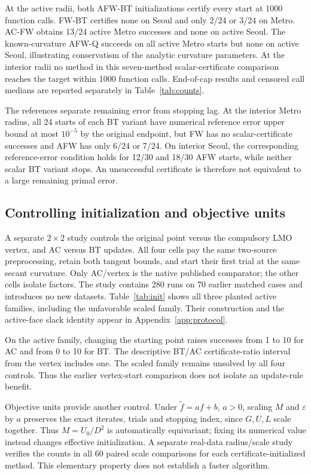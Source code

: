 At the active radii, both AFW-BT initializations certify every start at
1000 function calls. FW-BT certifies none on Seoul and only 2/24 or
3/24 on Metro. AC-FW obtains 13/24 active Metro successes and none
on active Seoul. The known-curvature AFW-Q succeeds on all active
Metro starts but none on active Seoul, illustrating conservatism of
the analytic curvature parameters. At the interior radii no method in
this seven-method scalar-certificate comparison reaches the target
within 1000 function calls. End-of-cap results and censored call
medians are reported separately in Table~\ref{tab:counts}.

The references separate remaining error from stopping lag. At the
interior Metro radius, all 24 starts of each BT variant have numerical
reference error upper bound at most $10^{-5}$ by the original endpoint,
but FW has no scalar-certificate successes and AFW has only 6/24 or
7/24. On interior Seoul, the corresponding reference-error condition
holds for 12/30 and 18/30 AFW starts, while neither scalar BT variant
stops. An unsuccessful certificate is therefore not equivalent to a
large remaining primal error.

\subsection{Controlling initialization and objective units}
A separate $2\times2$ study controls the original point versus the
compulsory LMO vertex, and AC versus BT updates. All four cells pay
the same two-source preprocessing, retain both tangent bounds, and
start their first trial at the same secant curvature. Only AC/vertex
is the native published comparator; the other cells isolate factors.
The study contains 280 runs on 70 earlier matched cases and introduces
no new datasets. Table~\ref{tab:init} shows all three planted active
families, including the unfavorable scaled family. Their construction
and the active-face slack identity appear in Appendix~\ref{app:protocol}.


On the active family, changing the starting point raises successes
from 1 to 10 for AC and from 0 to 10 for BT. The descriptive
BT/AC certificate-ratio interval from the vertex includes one.
The scaled family remains unsolved by all four controls. Thus the
earlier vertex-start comparison does not isolate an update-rule benefit.

Objective units provide another control. Under $\widetilde f=af+b$,
$a>0$, scaling $M$ and $\varepsilon$ by $a$ preserves the exact
iterates, trials and stopping index, since $G,U,L$ scale together.
Thus $M=U_0/D^2$ is automatically equivariant; fixing its numerical
value instead changes effective initialization. A separate real-data
radius/scale study verifies the counts in all 60 paired scale
comparisons for each certificate-initialized method. This elementary
property does not establish a faster algorithm.

